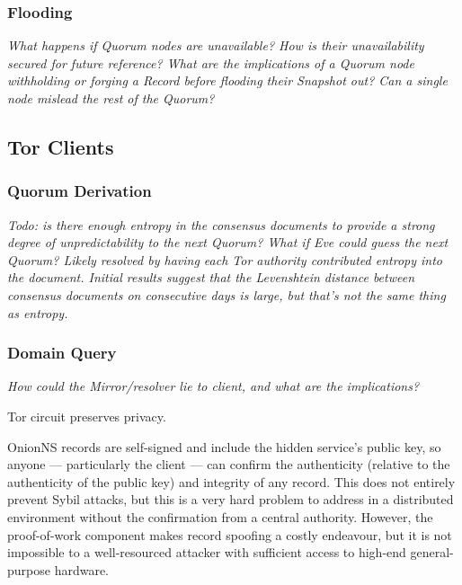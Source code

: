 \subsubsection{Flooding}

\emph{What happens if Quorum nodes are unavailable? How is their unavailability secured for future reference? What are the implications of a Quorum node withholding or forging a Record before flooding their Snapshot out? Can a single node mislead the rest of the Quorum?}


\subsection{Tor Clients}

\subsubsection{Quorum Derivation}

\emph{Todo: is there enough entropy in the consensus documents to provide a strong degree of unpredictability to the next Quorum? What if Eve could guess the next Quorum? Likely resolved by having each Tor authority contributed entropy into the document. Initial results suggest that the Levenshtein distance between consensus documents on consecutive days is large, but that's not the same thing as entropy.}

\subsubsection{Domain Query}

\emph{How could the Mirror/resolver lie to client, and what are the implications?}

Tor circuit preserves privacy.

OnionNS records are self-signed and include the hidden service's public key, so anyone --- particularly the client --- can confirm the authenticity (relative to the authenticity of the public key) and integrity of any record. This does not entirely prevent Sybil attacks, but this is a very hard problem to address in a distributed environment without the confirmation from a central authority. However, the proof-of-work component makes record spoofing a costly endeavour, but it is not impossible to a well-resourced attacker with sufficient access to high-end general-purpose hardware.

